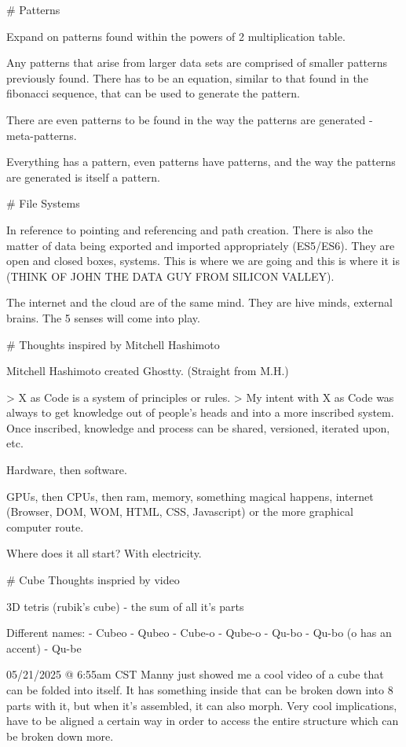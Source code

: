 # Patterns

Expand on patterns found within the powers of 2 multiplication table.

Any patterns that arise from larger data sets are comprised of smaller patterns previously found. There has to be an equation, similar to that found in the fibonacci sequence, that can be used to generate the pattern.

There are even patterns to be found in the way the patterns are generated - meta-patterns.

Everything has a pattern, even patterns have patterns, and the way the patterns are generated is itself a pattern.

# File Systems

In reference to pointing and referencing and path creation. There is also the matter of data being exported and imported appropriately (ES5/ES6). They are open and closed boxes, systems. This is where we are going and this is where it is (THINK OF JOHN THE DATA GUY FROM SILICON VALLEY).

The internet and the cloud are of the same mind. They are hive minds, external brains. The 5 senses will come into play. 

# Thoughts inspired by Mitchell Hashimoto

Mitchell Hashimoto created Ghostty. 
(Straight from M.H.) 

> X as Code is a system of principles or rules. 
> My intent with X as Code was always to get knowledge out of people's heads and into a more inscribed system. Once inscribed, knowledge and process can be shared, versioned, iterated upon, etc. 

Hardware, then software. 

GPUs, then CPUs, then ram, memory, something magical happens, internet (Browser, DOM, WOM, HTML, CSS, Javascript) or the more graphical computer route.

Where does it all start? With electricity. 

# Cube Thoughts inspried by video

3D tetris (rubik's cube) - the sum of all it's parts

Different names:
- Cubeo
- Qubeo
- Cube-o
- Qube-o
- Qu-bo
- Qu-bo (o has an accent)
- Qu-be

05/21/2025 @ 6:55am CST
Manny just showed me a cool video of a cube that can be folded into itself. It has something inside that can be broken down into 8 parts with it, but when it's assembled, it can also morph. Very cool implications, have to be aligned a certain way in order to access the entire structure which can be broken down more. 

